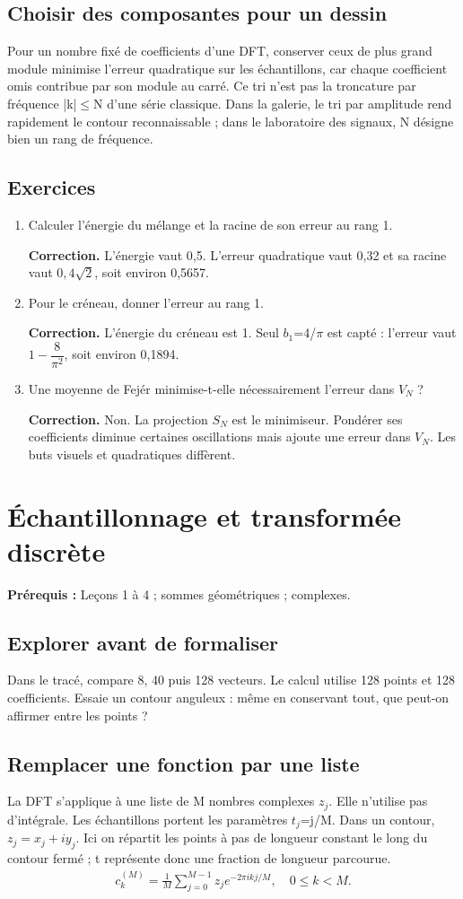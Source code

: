 \documentclass[11pt,a4paper]{article}
\begin{document}
\subsection{Choisir des composantes pour un dessin}
Pour un nombre fixé de coefficients d’une DFT, conserver ceux de plus grand module minimise l’erreur quadratique sur les échantillons, car chaque coefficient omis contribue par son module au carré. Ce tri n’est pas la troncature par fréquence |k|$\le$N d’une série classique. Dans la galerie, le tri par amplitude rend rapidement le contour reconnaissable ; dans le laboratoire des signaux, N désigne bien un rang de fréquence.
\subsection*{Exercices}\begin{enumerate}
\item Calculer l’énergie du mélange et la racine de son erreur au rang 1.
\par\textbf{Correction.} L’énergie vaut 0,5. L’erreur quadratique vaut 0,32 et sa racine vaut $0{,}4\sqrt2$, soit environ 0,5657.
\item Pour le créneau, donner l’erreur au rang 1.
\par\textbf{Correction.} L’énergie du créneau est 1. Seul $b_1$=4/$\pi$ est capté : l’erreur vaut $1-\dfrac8{\pi^2}$, soit environ 0,1894.
\item Une moyenne de Fejér minimise-t-elle nécessairement l’erreur dans $V_N$ ?
\par\textbf{Correction.} Non. La projection $S_N$ est le minimiseur. Pondérer ses coefficients diminue certaines oscillations mais ajoute une erreur dans $V_N$. Les buts visuels et quadratiques diffèrent.
\end{enumerate}
\clearpage
\section{Échantillonnage et transformée discrète}
\textbf{Prérequis :} Leçons 1 à 4 ; sommes géométriques ; complexes.
\subsection*{Explorer avant de formaliser}Dans le tracé, compare 8, 40 puis 128 vecteurs. Le calcul utilise 128 points et 128 coefficients. Essaie un contour anguleux : même en conservant tout, que peut-on affirmer entre les points ?
\subsection{Remplacer une fonction par une liste}
La DFT s’applique à une liste de M nombres complexes $z_j$. Elle n’utilise pas d’intégrale. Les échantillons portent les paramètres $t_j$=j/M. Dans un contour, $z_j=x_j+iy_j$. Ici on répartit les points à pas de longueur constant le long du contour fermé ; t représente donc une fraction de longueur parcourue.
\[\begin{gathered}c_k^{(M)}=\frac1M\sum_{j=0}^{M-1}z_j e^{-2\pi ikj/M},\quad 0\le k<M.\end{gathered}\]
\end{document}
